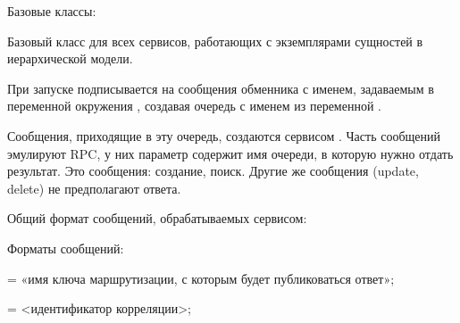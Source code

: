 \documentclass[a4paper,10pt,russian]{sphinxmanual}
\begin{document}
\begin{fulllineitems}

\pysigstartsignatures
{}
\pysigstopsignatures
\sphinxAtStartPar
Базовые классы: 

\sphinxAtStartPar
Базовый класс для всех сервисов, работающих с экземплярами сущностей
в иерархической модели.

\sphinxAtStartPar
При запуске подписывается на сообщения
обменника с именем, задаваемым в переменной окружения
,
создавая очередь с именем из переменной .

\sphinxAtStartPar
Сообщения, приходящие в эту очередь, создаются сервисом
.
Часть сообщений эмулируют RPC, у них параметр  содержит имя
очереди, в которую нужно отдать результат.
Это сообщения: создание, поиск. Другие же сообщения (update, delete)
не предполагают ответа.

\sphinxAtStartPar
Общий формат сообщений, обрабатываемых сервисом:

\begin{sphinxVerbatim}[commandchars=\\\{\}]

\end{sphinxVerbatim}

\sphinxAtStartPar
Форматы сообщений:

\sphinxAtStartPar
{}

\sphinxAtStartPar
{} = «имя ключа маршрутизации, с которым будет публиковаться ответ»;

\sphinxAtStartPar
{} = \textless{}идентификатор корреляции\textgreater{};


\end{fulllineitems}
\end{document}
